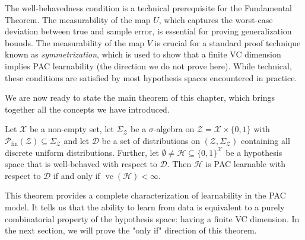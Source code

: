 The well-behavedness condition is a technical prerequisite for the Fundamental Theorem. The measurability of the map $U$, which captures the worst-case deviation between true and sample error, is essential for proving generalization bounds. The measurability of the map $V$ is crucial for a standard proof technique known as \emph{symmetrization}, which is used to show that a finite VC dimension implies PAC learnability (the direction we do not prove here). While technical, these conditions are satisfied by most hypothesis spaces encountered in practice.

We are now ready to state the main theorem of this chapter, which brings together all the concepts we have introduced.

\begin{theorem}
    \label{thm:fundamental-theorem}
    Let $\mathcal{X}$ be a non-empty set, let $\Sigma_{\mathcal{Z}}$ be a $\sigma$-algebra on $\mathcal{Z} = \mathcal{X} \times \{0,1\}$ with $\mathcal{P}_{\mathrm{fin}}(\mathcal{Z}) \subseteq \Sigma_{\mathcal{Z}}$ and let $\mathcal{D}$ be a set of distributions on $(\mathcal{Z},\Sigma_{\mathcal{Z}})$ containing all discrete uniform distributions. Further, let $\emptyset \neq \mathcal{H} \subseteq \{0,1\}^\mathcal{X}$ be a hypothesis space that is well-behaved with respect to $\mathcal{D}$. Then $\mathcal{H}$ is PAC learnable with respect to $\mathcal{D}$ if and only if $\operatorname{vc}(\mathcal{H}) < \infty$.
\end{theorem}

This theorem provides a complete characterization of learnability in the PAC model. It tells us that the ability to learn from data is equivalent to a purely combinatorial property of the hypothesis space: having a finite VC dimension. In the next section, we will prove the "only if" direction of this theorem.